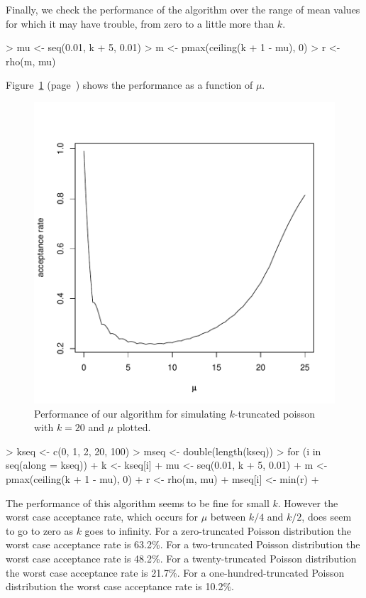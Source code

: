 \documentclass[11pt]{article}
\begin{document}
Finally, we check the performance of the algorithm over the range of
mean values for which it may have trouble, from zero to a little more
than $k$.
\begin{Schunk}
\begin{Sinput}
> mu <- seq(0.01, k + 5, 0.01)
> m <- pmax(ceiling(k + 1 - mu), 0)
> r <- rho(m, mu)
\end{Sinput}
\end{Schunk}
Figure~\ref{fig:fig2} (page~\pageref{fig:fig2})
shows the performance as a function of $\mu$.
\begin{figure}
\begin{center}
\includegraphics{trunc-fig2}
\end{center}
\caption{Performance of our algorithm for simulating
$k$-truncated poisson with $k = 20$ and $\mu$ plotted.}
\label{fig:fig2}
\end{figure}

\begin{Schunk}
\begin{Sinput}
> kseq <- c(0, 1, 2, 20, 100)
> mseq <- double(length(kseq))
> for (i in seq(along = kseq)) {
+     k <- kseq[i]
+     mu <- seq(0.01, k + 5, 0.01)
+     m <- pmax(ceiling(k + 1 - mu), 0)
+     r <- rho(m, mu)
+     mseq[i] <- min(r)
+ }
\end{Sinput}
\end{Schunk}

The performance of this algorithm seems to be fine for small $k$.
However the worst case acceptance rate, which occurs
for $\mu$ between $k / 4$ and $k / 2$,
does seem to go to zero as $k$ goes to infinity.
For a zero-truncated Poisson distribution the worst case acceptance
rate is 63.2\%.
For a two-truncated Poisson distribution the worst case acceptance
rate is 48.2\%.
For a twenty-truncated Poisson distribution the worst case acceptance
rate is 21.7\%.
For a one-hundred-truncated Poisson distribution the worst case acceptance
rate is 10.2\%.
\end{document}
